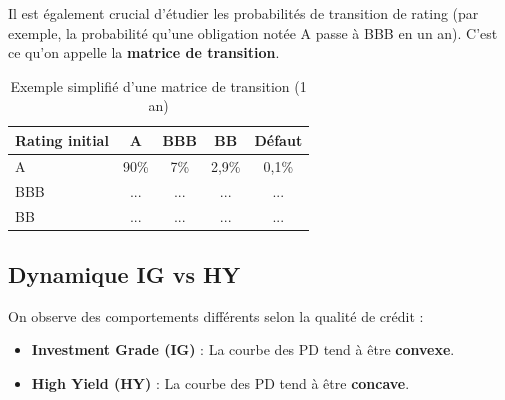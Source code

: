 Il est également crucial d'étudier les probabilités de transition de rating (par exemple, la probabilité qu'une obligation notée A passe à BBB en un an). C'est ce qu'on appelle la \textbf{matrice de transition}.

\begin{table}[H]
    \centering
    \begin{tabular}{|l|c|c|c|c|}
        \hline
        Rating initial & A & BBB & BB & Défaut \\ \hline
        A   & 90\% & 7\% & 2,9\% & 0,1\% \\ \hline
        BBB & ... & ... & ... & ... \\ \hline
        BB  & ... & ... & ... & ... \\ \hline
    \end{tabular}
    \caption{Exemple simplifié d'une matrice de transition (1 an)}
\end{table}

\subsection{Dynamique IG vs HY}

On observe des comportements différents selon la qualité de crédit :
\begin{itemize}
    \item \textbf{Investment Grade (IG)} : La courbe des PD tend à être \textbf{convexe}.
    \item \textbf{High Yield (HY)} : La courbe des PD tend à être \textbf{concave}.
\end{itemize}

